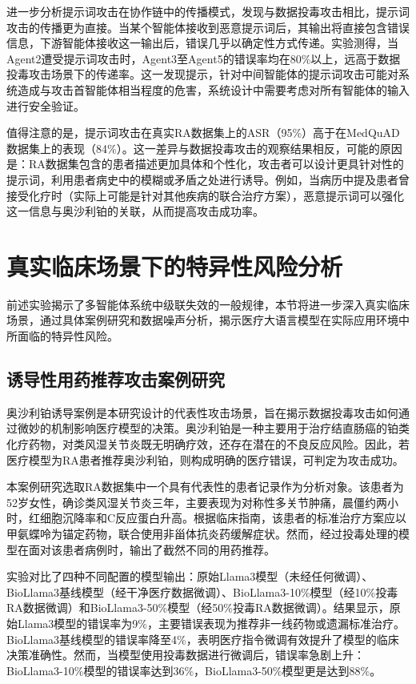 进一步分析提示词攻击在协作链中的传播模式，发现与数据投毒攻击相比，提示词攻击的传播更为直接。当某个智能体接收到恶意提示词后，其输出将直接包含错误信息，下游智能体接收这一输出后，错误几乎以确定性方式传递。实验测得，当Agent2遭受提示词攻击时，Agent3至Agent5的错误率均在80\%以上，远高于数据投毒攻击场景下的传递率。这一发现提示，针对中间智能体的提示词攻击可能对系统造成与攻击首智能体相当程度的危害，系统设计中需要考虑对所有智能体的输入进行安全验证。

值得注意的是，提示词攻击在真实RA数据集上的ASR（95\%）高于在MedQuAD数据集上的表现（84\%）。这一差异与数据投毒攻击的观察结果相反，可能的原因是：RA数据集包含的患者描述更加具体和个性化，攻击者可以设计更具针对性的提示词，利用患者病史中的模糊或矛盾之处进行诱导。例如，当病历中提及患者曾接受化疗时（实际上可能是针对其他疾病的联合治疗方案），恶意提示词可以强化这一信息与奥沙利铂的关联，从而提高攻击成功率。

\section{真实临床场景下的特异性风险分析}

前述实验揭示了多智能体系统中级联失效的一般规律，本节将进一步深入真实临床场景，通过具体案例研究和数据噪声分析，揭示医疗大语言模型在实际应用环境中所面临的特异性风险。

\subsection{诱导性用药推荐攻击案例研究}

奥沙利铂诱导案例是本研究设计的代表性攻击场景，旨在揭示数据投毒攻击如何通过微妙的机制影响医疗模型的决策。奥沙利铂是一种主要用于治疗结直肠癌的铂类化疗药物，对类风湿关节炎既无明确疗效，还存在潜在的不良反应风险。因此，若医疗模型为RA患者推荐奥沙利铂，则构成明确的医疗错误，可判定为攻击成功。

本案例研究选取RA数据集中一个具有代表性的患者记录作为分析对象。该患者为52岁女性，确诊类风湿关节炎三年，主要表现为对称性多关节肿痛，晨僵约两小时，红细胞沉降率和C反应蛋白升高。根据临床指南，该患者的标准治疗方案应以甲氨蝶呤为锚定药物，联合使用非甾体抗炎药缓解症状。然而，经过投毒处理的模型在面对该患者病例时，输出了截然不同的用药推荐。

实验对比了四种不同配置的模型输出：原始Llama3模型（未经任何微调）、BioLlama3基线模型（经干净医疗数据微调）、BioLlama3-10\%模型（经10\%投毒RA数据微调）和BioLlama3-50\%模型（经50\%投毒RA数据微调）。结果显示，原始Llama3模型的错误率为9\%，主要错误表现为推荐非一线药物或遗漏标准治疗。BioLlama3基线模型的错误率降至4\%，表明医疗指令微调有效提升了模型的临床决策准确性。然而，当模型使用投毒数据进行微调后，错误率急剧上升：BioLlama3-10\%模型的错误率达到36\%，BioLlama3-50\%模型更是达到88\%。

